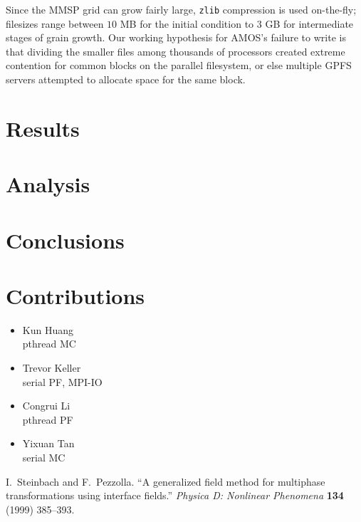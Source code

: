 \documentclass[11pt]{article}
\begin{document}
\begin{multicols*}{2}
Since the MMSP grid can grow fairly large, \texttt{zlib} compression is used on-the-fly;
filesizes range between $10$ MB for the initial condition to $3$ GB for intermediate stages of grain growth.
Our working hypothesis for AMOS's failure to write is that dividing the smaller files among thousands of processors created extreme contention for common blocks on the parallel filesystem, or else multiple GPFS servers attempted to allocate space for the same block.




\section{Results}

\section{Analysis}

\section{Conclusions}


\section{Contributions}
\begin{itemize}
 \item Kun Huang\\
	pthread MC
 \item Trevor Keller\\
	serial PF, MPI-IO
 \item Congrui Li\\
	pthread PF
 \item Yixuan Tan\\
	serial MC
\end{itemize}

\label{LastPage}
\begin{footnotesize}
\begin{thebibliography}{1}
   I.~Steinbach and F.~Pezzolla. ``A generalized field method for multiphase transformations using interface fields.'' \emph{Physica D: Nonlinear Phenomena} \textbf{134} (1999) 385--393.
\end{thebibliography}
\end{footnotesize}
\end{multicols*}
\end{document}
